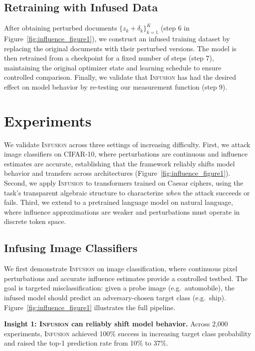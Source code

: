 \documentclass{article}
\theoremstyle{plain}
\theoremstyle{definition}
\theoremstyle{remark}
\begin{document}
\subsection{Retraining with Infused Data}

After obtaining perturbed documents $\{z_k + \delta_k\}_{k=1}^K$ (step 6 in Figure~\ref{fig:influence_figure1}), we construct an infused training dataset by replacing the original documents with their perturbed versions. The model is then retrained from a checkpoint for a fixed number of steps (step 7), maintaining the original optimizer state and learning schedule to ensure controlled comparison. Finally, we validate that \textsc{Infusion} has had the desired effect on model behavior by re-testing our measurement function (step 9).

\section{Experiments}

We validate \textsc{Infusion} across three settings of increasing difficulty. First, we attack image classifiers on CIFAR-10, where perturbations are continuous and influence estimates are accurate, establishing that the framework reliably shifts model behavior and transfers across architectures (Figure~\ref{fig:influence_figure1}). Second, we apply \textsc{Infusion} to transformers trained on Caesar ciphers, using the task's transparent algebraic structure to characterize \emph{when} the attack succeeds or fails. Third, we extend to a pretrained language model on natural language, where influence approximations are weaker and perturbations must operate in discrete token space.


\subsection{Infusing Image Classifiers}


We first demonstrate \textsc{Infusion} on image classification, where continuous pixel perturbations and accurate influence estimates provide a controlled testbed. The goal is targeted misclassification: given a probe image (e.g.\ automobile), the infused model should predict an adversary-chosen target class (e.g.\ ship). Figure~\ref{fig:influence_figure1} illustrates the full pipeline.


\textbf{Insight 1: \textsc{Infusion} can reliably shift model behavior.} Across 2,000 experiments, \textsc{Infusion} achieved 100\% success in increasing target class probability and raised the top-1 prediction rate from 10\% to 37\%.
\end{document}
